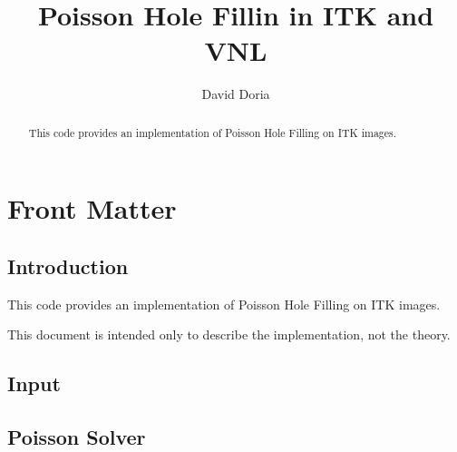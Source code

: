 \documentclass{InsightArticle}
\title{Poisson Hole Fillin in ITK and VNL}
\author{David Doria}
\newcommand{\IJhandlerIDnumber}{3253}
\begin{document}
%
% 
\IJhandlefooter{\IJhandlerIDnumber}


\ifpdf
\else
\fi


\maketitle


\ifhtml
\chapter*{Front Matter\label{front}}
\fi


\begin{abstract}
\noindent
This code provides an implementation of Poisson Hole Filling on ITK images.

\end{abstract}

\IJhandlenote{\IJhandlerIDnumber}

\tableofcontents

\section{Introduction}
This code provides an implementation of Poisson Hole Filling on ITK images.

This document is intended only to describe the implementation, not the theory.

\section{Input}

\section{Poisson Solver}
\end{document}
